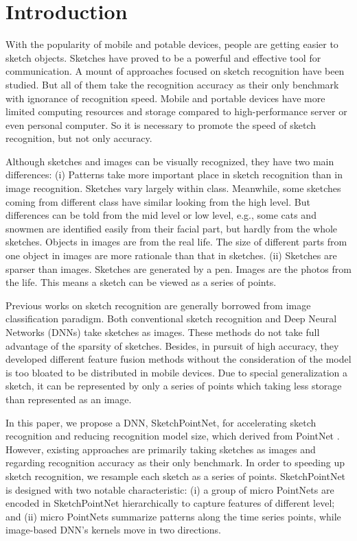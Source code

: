 \section{Introduction}
\label{sec:intro}

With the popularity of mobile and potable devices, people are getting easier to sketch objects. Sketches have proved to be a powerful and effective tool for communication. A mount of approaches focused on sketch recognition have been studied. But all of them take the recognition accuracy as their only benchmark with ignorance of recognition speed. Mobile and portable devices have more limited computing resources and storage compared to high-performance server or even personal computer. So it is necessary to promote the speed of sketch recognition, but not only accuracy.

Although sketches and images can be visually recognized, they have two main differences: (i) Patterns take more important place in sketch recognition than in image recognition. Sketches vary largely within class. Meanwhile, some sketches coming from different class have similar looking from the high level. But differences can be told from the mid level or low level, e.g., some cats and snowmen are identified easily from their facial part, but hardly from the whole sketches. Objects in images are from the real life. The size of different parts from one object in images are more rationale than that in sketches. (ii) Sketches are sparser than images. Sketches are generated by a pen. Images are the photos from the life. This means a sketch can be viewed as a series of points.

Previous works on sketch recognition are generally borrowed from image classification paradigm. Both conventional sketch recognition and Deep Neural Networks (DNNs) take sketches as images. These methods do not take full advantage of the sparsity of sketches. Besides, in pursuit of high accuracy, they developed different feature fusion methods without the consideration of the model is too bloated to be distributed in mobile devices. Due to special generalization a sketch, it can be represented by only a series of points which taking less storage than represented as an image.

In this paper, we propose a DNN, SketchPointNet, for accelerating sketch recognition and reducing recognition model size, which derived from PointNet \cite{qi2017pointnet}. However, existing approaches are primarily taking sketches as images and regarding recognition accuracy as their only benchmark. In order to speeding up sketch recognition, we resample each sketch as a series of points. SketchPointNet is designed with two notable characteristic: (i) a group of micro PointNets are encoded in SketchPointNet hierarchically to capture features of different level; and (ii) micro PointNets summarize patterns along the time series points, while image-based DNN's kernels move in two directions.

